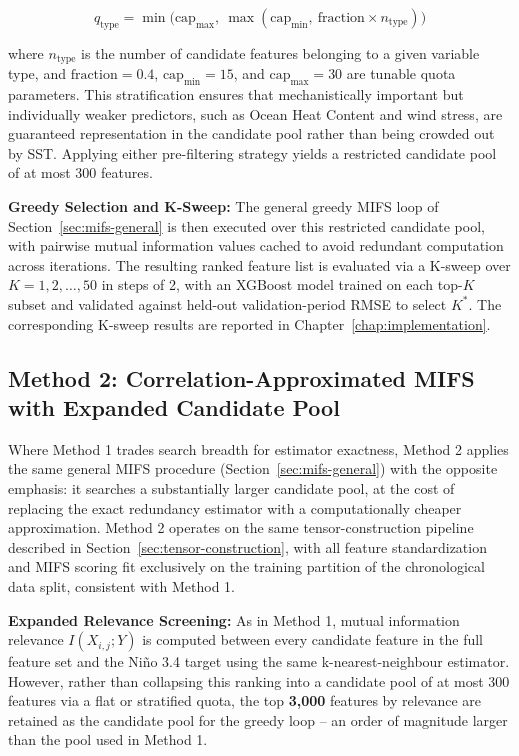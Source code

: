 \begin{equation}
q_{\text{type}} = \min\big(\text{cap}_{\max},\ \max(\text{cap}_{\min},\ \text{fraction} \times n_{\text{type}})\big)
\end{equation}

\noindent where $n_{\text{type}}$ is the number of candidate features belonging to a given variable type, and $\text{fraction} = 0.4$, $\text{cap}_{\min} = 15$, and $\text{cap}_{\max} = 30$ are tunable quota parameters. This stratification ensures that mechanistically important but individually weaker predictors, such as Ocean Heat Content and wind stress, are guaranteed representation in the candidate pool rather than being crowded out by SST. Applying either pre-filtering strategy yields a restricted candidate pool of at most 300 features.

\textbf{Greedy Selection and K-Sweep:} The general greedy MIFS loop of Section~\ref{sec:mifs-general} is then executed over this restricted candidate pool, with pairwise mutual information values cached to avoid redundant computation across iterations. The resulting ranked feature list is evaluated via a K-sweep over $K = 1, 2, \ldots, 50$ in steps of 2, with an XGBoost model trained on each top-$K$ subset and validated against held-out validation-period RMSE to select $K^*$. The corresponding K-sweep results are reported in Chapter~\ref{chap:implementation}.

\subsection{Method 2: Correlation-Approximated MIFS with Expanded Candidate Pool}
\label{sec:mifs-method2}

Where Method 1 trades search breadth for estimator exactness, Method 2 applies the same general MIFS procedure (Section~\ref{sec:mifs-general}) with the opposite emphasis: it searches a substantially larger candidate pool, at the cost of replacing the exact redundancy estimator with a computationally cheaper approximation. Method 2 operates on the same tensor-construction pipeline described in Section~\ref{sec:tensor-construction}, with all feature standardization and MIFS scoring fit exclusively on the training partition of the chronological data split, consistent with Method 1.

\textbf{Expanded Relevance Screening:} As in Method 1, mutual information relevance $I(X_{i,j}; Y)$ is computed between every candidate feature in the full feature set and the Ni\~{n}o 3.4 target using the same k-nearest-neighbour estimator. However, rather than collapsing this ranking into a candidate pool of at most 300 features via a flat or stratified quota, the top \textbf{3,000} features by relevance are retained as the candidate pool for the greedy loop -- an order of magnitude larger than the pool used in Method 1.

